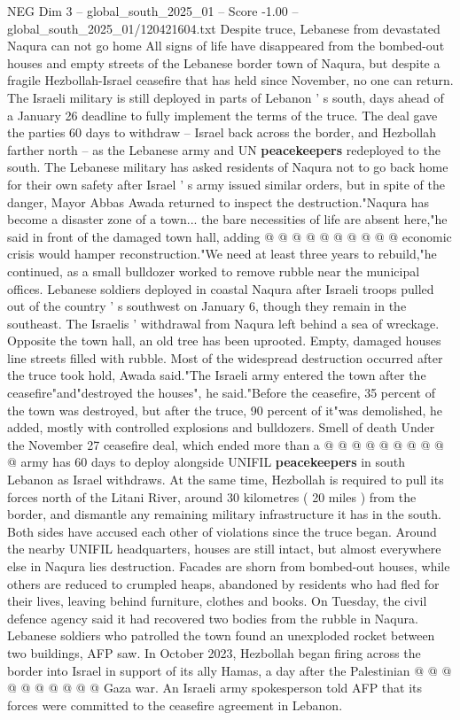 \begin{textsample}{NEG Dim 3 – global\_south\_2025\_01 – Score -1.00 – global\_south\_2025\_01/120421604.txt}  \label{ex:f3_neg_072}
Despite truce, Lebanese from devastated Naqura can not go home All signs of life have disappeared from the bombed-out houses and empty streets of the Lebanese border town of Naqura, but despite a fragile Hezbollah-Israel ceasefire that has held since November, no one can return.
The Israeli military is still deployed in parts of Lebanon ' s south, days ahead of a January 26 deadline to fully implement the terms of the truce.
The deal gave the parties 60 days to withdraw -- Israel back across the border, and Hezbollah farther north -- as the Lebanese army and UN \textbf{peacekeepers} redeployed to the south.
The Lebanese military has asked residents of Naqura not to go back home for their own safety after Israel ' s army issued similar orders, but in spite of the danger, Mayor Abbas Awada returned to inspect the destruction."Naqura has become a disaster zone of a town... the bare necessities of life are absent here,"he said in front of the damaged town hall, adding @ @ @ @ @ @ @ @ @ @ economic crisis would hamper reconstruction."We need at least three years to rebuild,"he continued, as a small bulldozer worked to remove rubble near the municipal offices.
Lebanese soldiers deployed in coastal Naqura after Israeli troops pulled out of the country ' s southwest on January 6, though they remain in the southeast.
The Israelis ' withdrawal from Naqura left behind a sea of wreckage.
Opposite the town hall, an old tree has been uprooted.
Empty, damaged houses line streets filled with rubble.
Most of the widespread destruction occurred after the truce took hold, Awada said."The Israeli army entered the town after the ceasefire"and"destroyed the houses", he said."Before the ceasefire, 35 percent of the town was destroyed, but after the truce, 90 percent of it"was demolished, he added, mostly with controlled explosions and bulldozers.
Smell of death Under the November 27 ceasefire deal, which ended more than a @ @ @ @ @ @ @ @ @ @ army has 60 days to deploy alongside UNIFIL \textbf{peacekeepers} in south Lebanon as Israel withdraws.
At the same time, Hezbollah is required to pull its forces north of the Litani River, around 30 kilometres ( 20 miles ) from the border, and dismantle any remaining military infrastructure it has in the south.
Both sides have accused each other of violations since the truce began.
Around the nearby UNIFIL headquarters, houses are still intact, but almost everywhere else in Naqura lies destruction.
Facades are shorn from bombed-out houses, while others are reduced to crumpled heaps, abandoned by residents who had fled for their lives, leaving behind furniture, clothes and books.
On Tuesday, the civil defence agency said it had recovered two bodies from the rubble in Naqura.
Lebanese soldiers who patrolled the town found an unexploded rocket between two buildings, AFP saw.
In October 2023, Hezbollah began firing across the border into Israel in support of its ally Hamas, a day after the Palestinian @ @ @ @ @ @ @ @ @ @ Gaza war.
An Israeli army spokesperson told AFP that its forces were committed to the ceasefire agreement in Lebanon.

\end{textsample}
